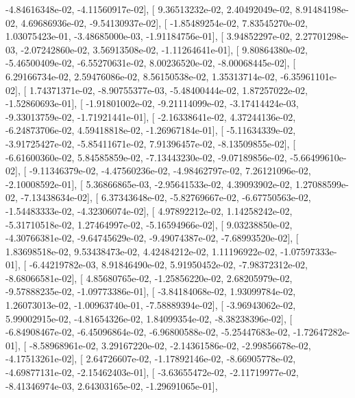 \documentclass{article}
\begin{document}
         -4.84616348e-02,  -4.11560917e-02],
       [  9.36513232e-02,   2.40492049e-02,   8.91484198e-02,
          4.69686936e-02,  -9.54130937e-02],
       [ -1.85489254e-02,   7.83545270e-02,   1.03075423e-01,
         -3.48685000e-03,  -1.91184756e-01],
       [  3.94852297e-02,   2.27701298e-03,  -2.07242860e-02,
          3.56913508e-02,  -1.11264641e-01],
       [  9.80864380e-02,  -5.46500409e-02,  -6.55270631e-02,
          8.00236520e-02,  -8.00068445e-02],
       [  6.29166734e-02,   2.59476086e-02,   8.56150538e-02,
          1.35313714e-02,  -6.35961101e-02],
       [  1.74371371e-02,  -8.90755377e-03,  -5.48400444e-02,
          1.87257022e-02,  -1.52860693e-01],
       [ -1.91801002e-02,  -9.21114099e-02,  -3.17414424e-03,
         -9.33013759e-02,  -1.71921441e-01],
       [ -2.16338641e-02,   4.37244136e-02,  -6.24873706e-02,
          4.59418818e-02,  -1.26967184e-01],
       [ -5.11634339e-02,  -3.91725427e-02,  -5.85411671e-02,
          7.91396457e-02,  -8.13509855e-02],
       [ -6.61600360e-02,   5.84585859e-02,  -7.13443230e-02,
         -9.07189856e-02,  -5.66499610e-02],
       [ -9.11346379e-02,  -4.47560236e-02,  -4.98462797e-02,
          7.26121096e-02,  -2.10008592e-01],
       [  5.36866865e-03,  -2.95641533e-02,   4.39093902e-02,
          1.27088599e-02,  -7.13438634e-02],
       [  6.37343648e-02,  -5.82769667e-02,  -6.67750563e-02,
         -1.54483333e-02,  -4.32306074e-02],
       [  4.97892212e-02,   1.14258242e-02,  -5.31710518e-02,
          1.27464997e-02,  -5.16594966e-02],
       [  9.03238850e-02,  -4.30766381e-02,  -9.64745629e-02,
         -9.49074387e-02,  -7.68993520e-02],
       [  1.83698518e-02,   9.53438473e-02,   4.42484212e-02,
          1.11196922e-02,  -1.07597333e-01],
       [ -6.44219782e-03,   8.91846490e-02,   5.91950452e-02,
         -7.98372312e-02,  -8.68066581e-02],
       [  4.85680765e-02,  -1.25856220e-02,   2.68205979e-02,
         -9.57888235e-02,  -1.09773386e-01],
       [ -3.84184068e-02,   1.93099784e-02,   1.26073013e-02,
         -1.00963740e-01,  -7.58889394e-02],
       [ -3.96943062e-02,   5.99002915e-02,  -4.81654326e-02,
          1.84099354e-02,  -8.38238396e-02],
       [ -6.84908467e-02,  -6.45096864e-02,  -6.96800588e-02,
         -5.25447683e-02,  -1.72647282e-01],
       [ -8.58968961e-02,   3.29167220e-02,  -2.14361586e-02,
         -2.99856678e-02,  -4.17513261e-02],
       [  2.64726607e-02,  -1.17892146e-02,  -8.66905778e-02,
         -4.69877131e-02,  -2.15462403e-01],
       [ -3.63655472e-02,  -2.11719977e-02,  -8.41346974e-03,
          2.64303165e-02,  -1.29691065e-01],
\end{document}
